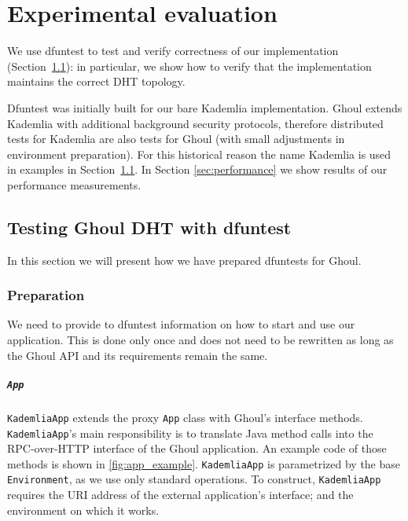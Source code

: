 \chapter{Experimental evaluation}
\label{ch:evaluation}

We use dfuntest to test and verify correctness of our implementation
(Section~\ref{sec:exampl-test-kademl}): in particular, we show how to verify
that the implementation maintains the correct DHT topology.

Dfuntest was initially built for our bare Kademlia implementation.
Ghoul extends Kademlia with additional background security protocols, therefore distributed tests for Kademlia are also tests for Ghoul (with small adjustments in environment preparation).
For this historical reason the name Kademlia is used in examples in
Section~\ref{sec:exampl-test-kademl}.
In Section \ref{sec:performance} we show results of our performance
measurements.
\section{Testing Ghoul DHT with dfuntest}
\label{sec:exampl-test-kademl}
In this section we will present how we have prepared dfuntests for Ghoul.

\subsection{Preparation}
We need to provide to dfuntest information on how to start and use our
application. This is done only once and does not need to be rewritten as long as
the Ghoul API and its requirements remain the same.

\paragraph{\texttt{App}}
\texttt{KademliaApp} extends the proxy \texttt{App} class with Ghoul's interface methods.
\texttt{KademliaApp}'s main responsibility is to translate Java method calls into the RPC-over-HTTP interface of the Ghoul application.
An example code of those methods is shown in \ref{fig:app_example}.
\texttt{KademliaApp} is parametrized by the base \texttt{Environment}, as we use only standard operations.
To construct, \texttt{KademliaApp} requires the URI address of the external
application's interface; and the environment on which it works.

